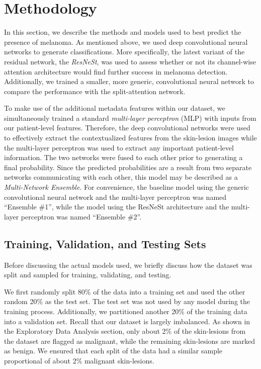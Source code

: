 \documentclass [MAS] {uclathes}
\begin{document}
\chapter{Methodology}

In this section, we describe the methods and models used to best predict the presence of melanoma. As mentioned above, we used deep convolutional neural networks to generate classifications. More specifically, the latest variant of the residual network, the \textit{ResNeSt}, was used to assess whether or not its channel-wise attention architecture would find further success in melanoma detection. Additionally, we trained a smaller, more generic, convolutional neural network to compare the performance with the split-attention network. 

To make use of the additional metadata features within our dataset, we simultaneously trained a standard \textit{multi-layer perceptron} (MLP) with inputs from our patient-level features. Therefore, the deep convolutional networks were used to effectively extract the contextualized features from the skin-lesion images while the multi-layer perceptron was used to extract any important patient-level information. The two networks were fused to each other prior to generating a final probability. Since the predicted probabilities are a result from two separate networks communicating with each other, this model may be described as a \textit{Multi-Network Ensemble}. For convenience, the baseline model using the generic convolutional neural network and the multi-layer perceptron was named ``Ensemble \#1'', while the model using the ResNeSt architecture and the multi-layer perceptron was named ``Ensemble \#2''.

\section{Training, Validation, and Testing Sets}

Before discussing the actual models used, we briefly discuss how the dataset was split and sampled for training, validating, and testing.

We first randomly split 80\% of the data into a training set and used the other random 20\% as the test set. The test set was
not used by any model during the training process. Additionally, we partitioned another 20\% of the training data into a validation set. Recall that our dataset is largely imbalanced. As shown in the Exploratory Data Analysis section, only about 2\% of the skin-lesions from the dataset are flagged as malignant, while the remaining skin-lesions are marked as benign. We ensured that each split of the data had a similar sample proportional of about 2\% malignant skin-lesions.
\end{document}
